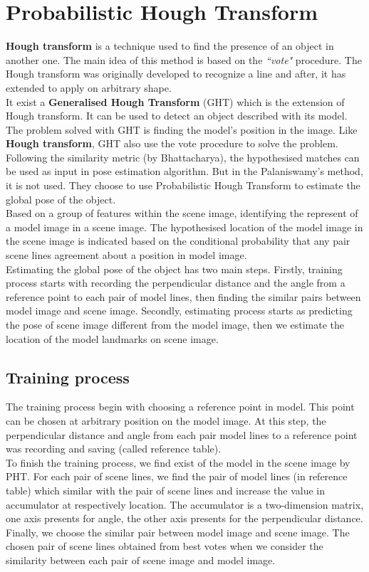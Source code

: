 \section{Probabilistic Hough Transform}
\textbf{Hough transform} is a technique used to find the presence of an object in another one. The main idea of this method is based on the \textit{``vote"} procedure. The Hough transform was originally developed to recognize a line\cite{hough1962method} and after, it has extended to apply on arbitrary shape\cite{duda1972use}.\\[0.2cm]
It exist a \textbf{Generalised Hough Transform}\cite{ballard1981generalizing} (GHT) which is the extension of Hough transform. It can be used to detect an object described with its model. The problem solved with GHT is finding the model's position in the image. Like \textbf{Hough transform}, GHT also use the vote procedure to solve the problem. Following the similarity metric (by Bhattacharya), the hypothesised matches can be used as input in pose estimation algorithm. But in the Palaniswamy's method, it is not used. They choose to use Probabilistic Hough Transform to estimate the global pose of the object\cite{ashbrook1995robust}.\\[0.3cm]
Based on a group of features within the scene image, identifying the represent of a model image in a scene image. The hypothesised location of the model image in the scene image is indicated based on the conditional probability that any pair scene lines agreement about a position in model image.\\[0.3cm]
Estimating the global pose of the object has two main steps. Firstly, training process starts with recording the perpendicular distance and the angle from a reference point to each pair of model lines, then finding the similar pairs between model image and scene image. Secondly, estimating process starts as predicting the pose of scene image different from the model image, then we estimate the location of the model landmarks on scene image.
\subsection{Training process}
The training process begin with choosing a reference point in model. This point can be chosen at arbitrary position on the model image. At this step, the perpendicular distance and angle from each pair model lines to a reference point was recording and saving (called reference table). \\
To finish the training process, we find exist of the model in the scene image by PHT. For each pair of scene lines, we find the pair of model lines (in reference table) which similar with the pair of scene lines and increase the value in accumulator at respectively location. The accumulator is a two-dimension matrix, one axis presents for angle, the other axis presents for the perpendicular distance. Finally, we choose the similar pair between model image and scene image. The chosen pair of scene lines obtained from best votes when we consider the similarity between each pair of scene image and model image.
